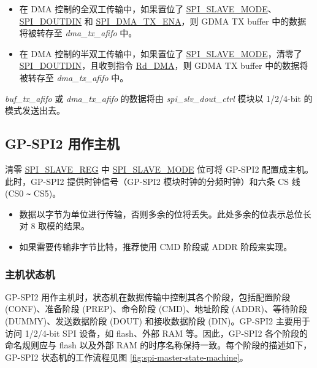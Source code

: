 \documentclass[main\_\_CN.tex]{subfiles}
\begin{document}
\begin{itemize}
\begin{itemize}
        \item 在 DMA 控制的全双工传输中，如果置位了 \hyperref[fielddesc:SPISLAVEMODE]{SPI\_SLAVE\_MODE}、\hyperref[fielddesc:SPIDOUTDIN]{SPI\_DOUTDIN} 和 \hyperref[fielddesc:SPIDMATXENA]{SPI\_DMA\_TX\_ENA}，则 GDMA TX buffer 中的数据将被转存至 \emph{dma\_tx\_afifo} 中。

        \item 在 DMA 控制的半双工传输中，如果置位了 \hyperref[fielddesc:SPISLAVEMODE]{SPI\_SLAVE\_MODE}，清零了 \hyperref[fielddesc:SPIDOUTDIN]{SPI\_DOUTDIN}，且收到指令 \hyperref[cmd:rddma]{Rd\_DMA}，则 GDMA TX buffer 中的数据将被转存至 \emph{dma\_tx\_afifo} 中。

    \end{itemize}

\emph{buf\_tx\_afifo} 或 \emph{dma\_tx\_afifo} 的数据将由 \emph{spi\_slv\_dout\_ctrl} 模块以 1/2/4-bit 的模式发送出去。
\end{itemize}

\subsection{GP-SPI2 用作主机}\label{sec:spi-master-mode}
清零 \hyperref[regdesc:SPISLAVEREG]{SPI\_SLAVE\_REG} 中 \hyperref[fielddesc:SPISLAVEMODE]{SPI\_SLAVE\_MODE} 位可将 GP-SPI2 配置成主机。此时，GP-SPI2 提供时钟信号（GP-SPI2 模块时钟的分频时钟）和六条 CS 线 (CS0 \verb+~+ CS5)。

\begin{tiplisting}
\vspace{-2em}
\begin{itemize}
    \item 数据以字节为单位进行传输，否则多余的位将丢失。此处多余的位表示总位长对 8 取模的结果。
    \item 如果需要传输非字节比特，推荐使用 CMD 阶段或 ADDR 阶段来实现。
\end{itemize}
\end{tiplisting}


\subsubsection{主机状态机}
\label{para:spi-state-machine}

GP-SPI2 用作主机时，状态机在数据传输中控制其各个阶段，包括配置阶段 (CONF)、准备阶段 (PREP)、命令阶段 (CMD)、地址阶段 (ADDR)、等待阶段 (DUMMY)、发送数据阶段 (DOUT) 和接收数据阶段 (DIN)。GP-SPI2 主要用于访问 1/2/4-bit SPI 设备，如 flash、外部 RAM 等。因此，GP-SPI2 各个阶段的命名规则应与 flash 以及外部 RAM 的时序名称保持一致。每个阶段的描述如下，GP-SPI2 状态机的工作流程见图  \ref{fig:spi-master-state-machine}。
\end{document}
